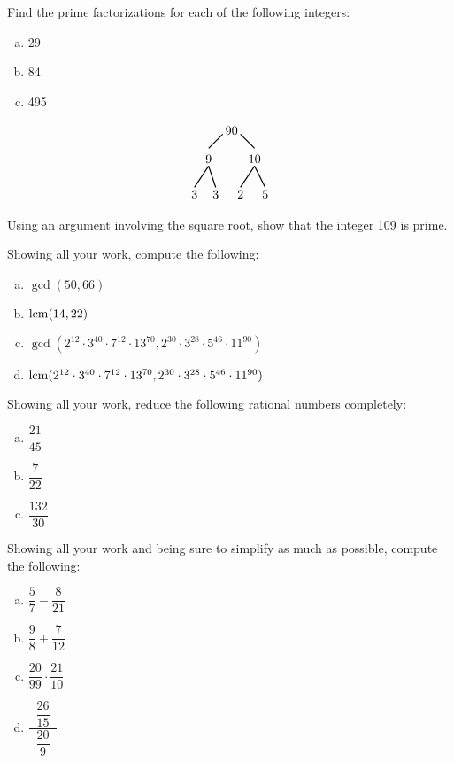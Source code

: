 \documentclass[12pt,letterpaper]{exam}
\begin{document}
\begin{questions}
\newpage
\question[10] Find the prime factorizations for each of the following integers:
        \begin{enumerate}[(a)]
        \item 29
        \item 84
        \item 495
        \end{enumerate}
	\[
	\begin{tikzpicture}
	\node at (-0.15,0) {$90$};
	\draw[line width=0.03cm] (-0.4,-0.1) -- (-0.8,-0.5);
	\node at (-0.8,-0.8) {$9$};
	\draw[line width=0.03cm]  (0.1,-0.1) -- (0.5,-0.5);
	\node at (0.5,-0.8) {$10$};
		
	\draw[line width=0.03cm] (-0.8,-1) -- (-1.2,-1.6);
	\node at (-1.2,-1.8) {$3$};
	\draw[line width=0.03cm] (-0.8,-1) -- (-0.6,-1.6);
	\node at (-0.6,-1.8) {$3$};
	
	\draw[line width=0.03cm] (0.5,-1) -- (0.1,-1.6);
	\node at (0.1,-1.8) {$2$};
	\draw[line width=0.03cm] (0.5,-1) -- (0.8,-1.6);
	\node at (0.8,-1.8) {$5$};
	\end{tikzpicture}
	\]


\newpage
\question[10] Using an argument involving the square root, show that the integer 109 is prime. 



\newpage
\question[10] Showing all your work, compute the following:
	\begin{enumerate}[(a)]
	\item $\gcd(50, 66)$
	\item $\operatorname{lcm}(14, 22)$
	\item $\gcd(2^{12} \cdot 3^{40} \cdot 7^{12} \cdot 13^{70}, 2^{30} \cdot 3^{28} \cdot 5^{46} \cdot 11^{90})$
	\item $\operatorname{lcm}(2^{12} \cdot 3^{40} \cdot 7^{12} \cdot 13^{70}, 2^{30} \cdot 3^{28} \cdot 5^{46} \cdot 11^{90})$
	\end{enumerate}



\newpage
\question[10] Showing all your work, reduce the following rational numbers completely:
	\begin{enumerate}[(a)]
	\item $\dfrac{21}{45}$
	\item $\dfrac{7}{22}$
	\item $\dfrac{132}{30}$
	\end{enumerate}



\newpage
\question[10] Showing all your work and being sure to simplify as much as possible, compute the following:
	\begin{enumerate}[(a)] \itemsep=0.3cm
	\item $\dfrac{5}{7} - \dfrac{8}{21}$
	\item $\dfrac{9}{8} + \dfrac{7}{12}$
	\item $\dfrac{20}{99} \cdot \dfrac{21}{10}$
	\item $\dfrac{\;\;\dfrac{26}{15}\;\;}{\;\;\dfrac{20}{9}\;\;}$
	\end{enumerate}




\end{questions}
\end{document}
